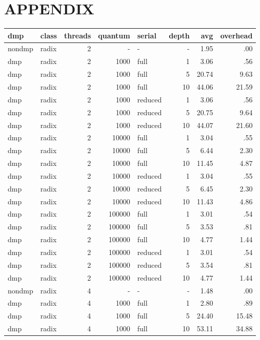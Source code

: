 \chapter{APPENDIX}
\label{APPENDIX}

\begin{center}
\begin{small}
\begin{longtable}{llrrlrrr}
\hline
dmp & class & threads & quantum & serial & depth & avg & overhead\\
\hline
nondmp & radix & 2 & - & - & - & 1.95 & .00\\
dmp & radix & 2 & 1000 & full & 1 & 3.06 & .56\\
dmp & radix & 2 & 1000 & full & 5 & 20.74 & 9.63\\
dmp & radix & 2 & 1000 & full & 10 & 44.06 & 21.59\\
dmp & radix & 2 & 1000 & reduced & 1 & 3.06 & .56\\
dmp & radix & 2 & 1000 & reduced & 5 & 20.75 & 9.64\\
dmp & radix & 2 & 1000 & reduced & 10 & 44.07 & 21.60\\
dmp & radix & 2 & 10000 & full & 1 & 3.04 & .55\\
dmp & radix & 2 & 10000 & full & 5 & 6.44 & 2.30\\
dmp & radix & 2 & 10000 & full & 10 & 11.45 & 4.87\\
dmp & radix & 2 & 10000 & reduced & 1 & 3.04 & .55\\
dmp & radix & 2 & 10000 & reduced & 5 & 6.45 & 2.30\\
dmp & radix & 2 & 10000 & reduced & 10 & 11.43 & 4.86\\
dmp & radix & 2 & 100000 & full & 1 & 3.01 & .54\\
dmp & radix & 2 & 100000 & full & 5 & 3.53 & .81\\
dmp & radix & 2 & 100000 & full & 10 & 4.77 & 1.44\\
dmp & radix & 2 & 100000 & reduced & 1 & 3.01 & .54\\
dmp & radix & 2 & 100000 & reduced & 5 & 3.54 & .81\\
dmp & radix & 2 & 100000 & reduced & 10 & 4.77 & 1.44\\
\hline
nondmp & radix & 4 & - & - & - & 1.48 & .00\\
dmp & radix & 4 & 1000 & full & 1 & 2.80 & .89\\
dmp & radix & 4 & 1000 & full & 5 & 24.40 & 15.48\\
dmp & radix & 4 & 1000 & full & 10 & 53.11 & 34.88\\

\end{longtable}
\end{small}
\end{center}
